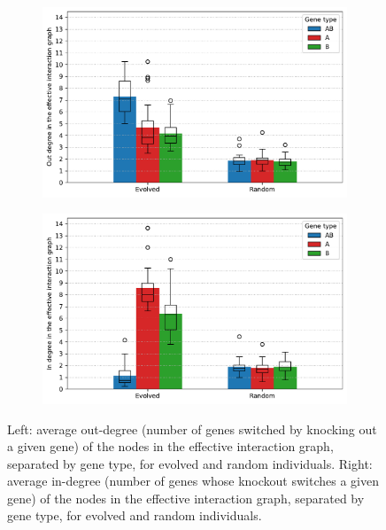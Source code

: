 \begin{figure}[H]
\begin{subfigure}[t]{0.49\textwidth}
\includegraphics[width=\textwidth]{ploscb/img/effective_graph_combined_out_degree.pdf}
\end{subfigure}
\begin{subfigure}[t]{0.49\textwidth}
\includegraphics[width=\textwidth]{ploscb/img/effective_graph_combined_in_degree.pdf}
\end{subfigure}
\caption[Average in- and out-degree of effective interaction graph nodes for evolved and random individuals]{Left: average out-degree (number of genes switched by knocking out a given gene) of the nodes in the effective interaction graph, separated by gene type, for evolved and random individuals.
Right: average in-degree (number of genes whose knockout switches a given gene) of the nodes in the effective interaction graph, separated by gene type, for evolved and random individuals.}
\label{fig:ploscb:ko_data}
\end{figure}


